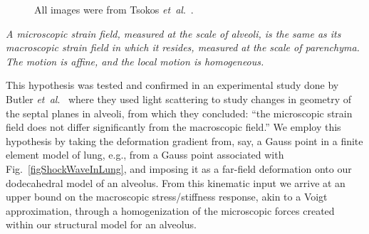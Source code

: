 \begin{figure}
    \centering
    \hfill
    \hfill
    \caption{All images were from Tsokos \textit{et~al}.\ \cite{Tsokosetal03}.}
    \label{figAlveolarDamage}
\end{figure}

\begin{conj}
\textit{A micro\-scopic strain field, measured at the scale of alveoli, is the same as its macro\-scopic strain field in which it resides, measured at the scale of parenchyma.  The motion is affine, and the local motion is homogeneous.}  
\label{conjecture}
\end{conj}

This hypothesis was tested and confirmed in an experimental study done by Butler \textit{et~al}.\ \cite{Butleretal96} where they used light scattering to study changes in geometry of the septal planes in alveoli, from which they concluded: ``the micro\-scopic strain field does not differ significantly from the macro\-scopic field.''  We employ this hypothesis by taking the deformation gradient from, say, a Gauss point in a finite element model of lung, e.g., from a Gauss point associated with Fig.~\ref{figShockWaveInLung}, and imposing it as a far-field deformation onto our dodecahedral model of an alveolus.  From this kinematic input we arrive at an upper bound on the macro\-scopic stress\slash stiffness response, akin to a Voigt approximation, through a homogenization of the micro\-scopic forces created within our structural model for an alveolus.

